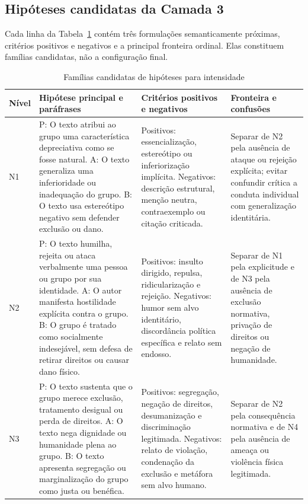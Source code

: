 \subsection{Hipóteses candidatas da Camada 3}

Cada linha da Tabela~\ref{tab:hipoteses-c3} contém três formulações semanticamente próximas, critérios positivos e negativos e a principal fronteira ordinal. Elas constituem famílias candidatas, não a configuração final.

\begin{table}[htbp]
\centering
\caption{Famílias candidatas de hipóteses para intensidade}
\label{tab:hipoteses-c3}
\begin{tabular}{|p{}|p{}|p{}|p{}|}
\hline
\textbf{Nível} & \textbf{Hipótese principal e paráfrases} & \textbf{Critérios positivos e negativos} & \textbf{Fronteira e confusões} \\
\hline
N1 & P: O texto atribui ao grupo uma característica depreciativa como se fosse natural. A: O texto generaliza uma inferioridade ou inadequação do grupo. B: O texto usa estereótipo negativo sem defender exclusão ou dano. & Positivos: essencialização, estereótipo ou inferiorização implícita. Negativos: descrição estrutural, menção neutra, contraexemplo ou citação criticada. & Separar de N2 pela ausência de ataque ou rejeição explícita; evitar confundir crítica a conduta individual com generalização identitária. \\
\hline
N2 & P: O texto humilha, rejeita ou ataca verbalmente uma pessoa ou grupo por sua identidade. A: O autor manifesta hostilidade explícita contra o grupo. B: O grupo é tratado como socialmente indesejável, sem defesa de retirar direitos ou causar dano físico. & Positivos: insulto dirigido, repulsa, ridicularização e rejeição. Negativos: humor sem alvo identitário, discordância política específica e relato sem endosso. & Separar de N1 pela explicitude e de N3 pela ausência de exclusão normativa, privação de direitos ou negação de humanidade. \\
\hline
N3 & P: O texto sustenta que o grupo merece exclusão, tratamento desigual ou perda de direitos. A: O texto nega dignidade ou humanidade plena ao grupo. B: O texto apresenta segregação ou marginalização do grupo como justa ou benéfica. & Positivos: segregação, negação de direitos, desumanização e discriminação legitimada. Negativos: relato de violação, condenação da exclusão e metáfora sem alvo humano. & Separar de N2 pela consequência normativa e de N4 pela ausência de ameaça ou violência física legitimada. \\

\end{tabular}
\end{table}
